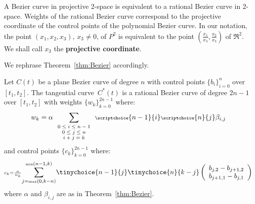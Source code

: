 \documentclass[10pt,twocolumn]{article}
\newcommand{\tang}{tangential curve\ }
\begin{document}
A Bezier curve in projective 2-space is equivalent to a 
rational Bezier curve in 2-space.
Weights of the rational Bezier curve correspond to the
projective coordinate of the control points of the polynomial Bezier curve.
In our notation, the point $(x_1,x_2,x_3),\ x_3 \neq 0$, of $P^2$ is equivalent 
to the point $(\frac{x_1}{x_3}, \frac{x_2}{x_3})$ of $\Re^2$.
We shall call $x_3$ the {\bf projective coordinate}.

We rephrase Theorem~\ref{thm:Bezier} accordingly.

\begin{corollary}
\label{thm:rationaldual}
Let $C(t)$ be a plane Bezier curve of degree $n$ 
with control points $\{ b_i \}_{i=0}^n$ over $[t_1,t_2]$.
The \tang $C^*(t)$ is a rational Bezier curve of degree $2n-1$ 
over $[t_1,t_2]$ with weights $\{w_k\}_{k=0}^{2n-1}$ where: 
\begin{equation}
\label{eq:wt}
\scriptsize{
w_k = \alpha
\sum_{\begin{array}{c}       0 \leq i \leq n-1 \\ 
			     0 \leq j \leq n \\ 
			     i+j=k
			     \end{array}}
\scriptchoice{n-1}{i} \scriptchoice{n}{j} \beta_{i,j}
}
\end{equation}
%
and control points $\{c_k\}_{k=0}^{2n-1}$ where:
\[
\scriptstyle{
	c_k = \frac{\alpha}{w_k} 
	\displaystyle{\sum_{j=\mbox{\tiny{max}}(0,k-n)}^{\mbox{\tiny{min}}(n-1,k)}}
	\tinychoice{n-1}{j} \tinychoice{n}{k-j} 
	\left( \begin{array}{c} 
	b_{j,2}   - b_{j+1,2} \\
	b_{j+1,1} - b_{j,1}
	\end{array} \right) 
}
\]
where $\alpha$ and $\beta_{i,j}$ are as in Theorem~\ref{thm:Bezier}.
\end{corollary}
\end{document}
